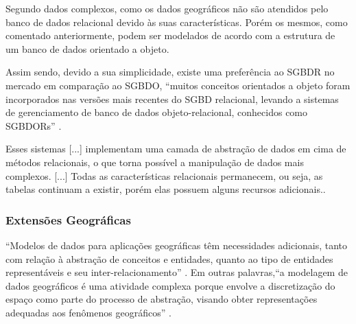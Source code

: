 
Segundo  dados complexos, como os dados geográficos não são atendidos pelo banco de dados relacional devido às suas características. Porém os mesmos, como comentado anteriormente, podem ser modelados de acordo com a estrutura de um banco de dados orientado a objeto. 

Assim sendo, devido a sua simplicidade, existe uma preferência ao SGBDR no mercado em comparação ao SGBDO, ``muitos conceitos orientados a objeto foram incorporados nas versões mais recentes do SGBD relacional, levando a sistemas de gerenciamento de banco de dados objeto-relacional, conhecidos como SGBDORs'' \cite[p.16]{navathe2011fundamentals}.
\begin{citacao}
    Esses sistemas [...] implementam uma camada de abstração de dados em cima de métodos relacionais, o que torna possível a manipulação de dados mais complexos. [...] Todas as características relacionais permanecem, ou seja, as tabelas continuam a existir, porém elas possuem alguns recursos adicionais.\cite[p.4]{alexandruk2011modelagem}.
\end{citacao}

\subsubsection{Extensões Geográficas}\label{ext_geo}
``Modelos de dados para aplicações geográficas têm necessidades adicionais, tanto com relação à abstração de conceitos e entidades, quanto ao tipo de entidades representáveis e seu inter-relacionamento'' \cite[p.86]{borges2005modelagem}. Em outras palavras,``a modelagem de dados geográficos é uma atividade complexa porque envolve a discretização do espaço como parte do processo de abstração, visando obter representações adequadas aos fenômenos geográficos'' \cite[p.30]{queiroz2006tutorial}.


